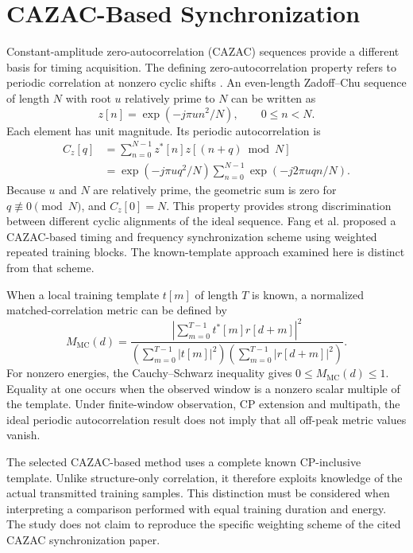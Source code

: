 \section{CAZAC-Based Synchronization}
Constant-amplitude zero-autocorrelation (CAZAC) sequences provide a different basis for timing acquisition. The defining zero-autocorrelation property refers to periodic correlation at nonzero cyclic shifts \cite{chu1972}. An even-length Zadoff--Chu sequence of length $N$ with root $u$ relatively prime to $N$ can be written as
\begin{equation}
 z[n]=\exp(-j\pi u n^2/N),\qquad 0\leq n<N.
 \label{eq:zc_sequence}
\end{equation}
Each element has unit magnitude. Its periodic autocorrelation is
\begin{align}
 C_z[q]&=\sum_{n=0}^{N-1}z^*[n]z[(n+q)\bmod N]\\
 &=\exp(-j\pi u q^2/N)\sum_{n=0}^{N-1}\exp(-j2\pi uqn/N).
\end{align}
Because $u$ and $N$ are relatively prime, the geometric sum is zero for $q\not\equiv0\pmod N$, and $C_z[0]=N$. This property provides strong discrimination between different cyclic alignments of the ideal sequence. Fang et al. \cite{fang2012} proposed a CAZAC-based timing and frequency synchronization scheme using weighted repeated training blocks. The known-template approach examined here is distinct from that scheme.

When a local training template $t[m]$ of length $T$ is known, a normalized matched-correlation metric can be defined by
\begin{equation}
 M_{\mathrm{MC}}(d)=\frac{\left|\sum_{m=0}^{T-1}t^*[m]r[d+m]\right|^2}
 {\left(\sum_{m=0}^{T-1}|t[m]|^2\right)\left(\sum_{m=0}^{T-1}|r[d+m]|^2\right)}.
 \label{eq:matched_metric}
\end{equation}
For nonzero energies, the Cauchy--Schwarz inequality gives $0\leq M_{\mathrm{MC}}(d)\leq1$. Equality at one occurs when the observed window is a nonzero scalar multiple of the template. Under finite-window observation, CP extension and multipath, the ideal periodic autocorrelation result does not imply that all off-peak metric values vanish.

The selected CAZAC-based method uses a complete known CP-inclusive template. Unlike structure-only correlation, it therefore exploits knowledge of the actual transmitted training samples. This distinction must be considered when interpreting a comparison performed with equal training duration and energy. The study does not claim to reproduce the specific weighting scheme of the cited CAZAC synchronization paper.

